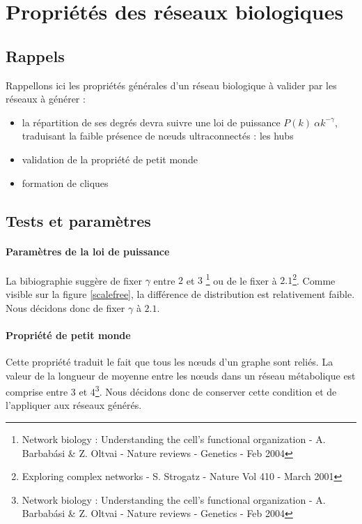 \section{Propriétés des réseaux biologiques}


\subsection{Rappels}
Rappellons ici les propriétés générales d'un réseau biologique à valider par les réseaux à générer :
\begin{itemize}
	\item la répartition de ses degrés devra suivre une loi de puissance $ P(k) ~ \alpha k^{-\gamma} $, traduisant la faible présence de nœuds ultraconnectés : les hubs
	\item validation de la propriété de \og petit monde\fg
	\item formation de cliques 
\end{itemize}

\subsection{Tests et paramètres}
\paragraph*{Paramètres de la loi de puissance\\}
La bibiographie suggère de fixer $\gamma $ entre $2$ et $3$ \footnote{Network biology : Understanding the cell's functional organization - A. Barbab\'{a}si \& Z. Oltvai - Nature reviews - Genetics - Feb 2004} ou de le fixer à $2.1$\footnote{Exploring complex networks - S. Strogatz - Nature Vol 410 - March 2001}. Comme visible sur la figure \ref{scalefree}, la différence de distribution est relativement faible. Nous décidons donc de fixer $\gamma$ à $2.1$.


\paragraph*{Propriété de petit monde \\}
Cette propriété traduit le fait que tous les nœuds d'un graphe sont reliés. La valeur de la longueur de moyenne entre les nœuds dans un réseau métabolique est comprise entre $3$ et $4$\footnote{Network biology : Understanding the cell's functional organization - A. Barbab\'{a}si \& Z. Oltvai - Nature reviews - Genetics - Feb 2004}. Nous décidons donc de conserver cette condition et de l'appliquer aux réseaux générés.

